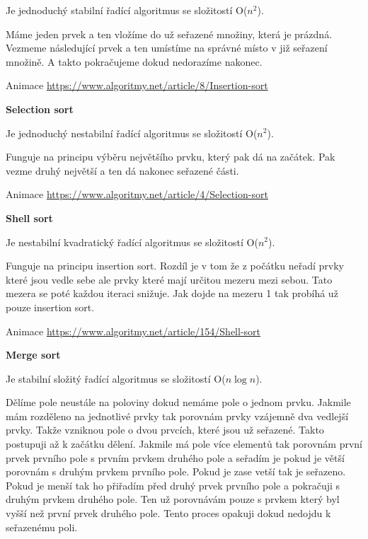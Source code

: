 Je jednoduchý stabilní řadící algoritmus se složitostí O($n^2$).

Máme jeden prvek a ten vložíme do už seřazené množiny, která je prázdná. Vezmeme následující prvek a ten umístíme na správné místo v již seřazení množině. A takto pokračujeme dokud nedorazíme nakonec.

Animace \url{https://www.algoritmy.net/article/8/Insertion-sort}

\begin{Large}\vspace{0,5cm} \textbf{Selection sort}
\end{Large}

Je jednoduchý nestabilní řadící algoritmus se složitostí O($n^2$).

Funguje na principu výběru největšího prvku, který pak dá na začátek. Pak vezme druhý největší a ten dá nakonec seřazené části.

Animace \url{https://www.algoritmy.net/article/4/Selection-sort}

\begin{Large}\vspace{0,5cm} \textbf{Shell sort}
\end{Large}

Je nestabilní kvadratický řadící algoritmus se složitostí O($n^2$).

Funguje na principu insertion sort. Rozdíl je v tom že z počátku neřadí prvky které jsou vedle sebe ale prvky které mají určitou mezeru mezi sebou. Tato mezera se poté každou iteraci snižuje. Jak dojde na mezeru 1 tak probíhá už pouze insertion sort.

Animace \url{https://www.algoritmy.net/article/154/Shell-sort}

\begin{Large}\vspace{0,5cm} \textbf{Merge sort}
\end{Large}

Je stabilní složitý řadící algoritmus se složitostí O($n\log{n}$).

Dělíme pole neustále na poloviny dokud nemáme pole o jednom prvku. Jakmile mám rozděleno na jednotlivé prvky tak porovnám prvky vzájemně dva vedlejší prvky. Takže vzniknou pole o dvou prvcích, které jsou už seřazené. Takto postupuji až k začátku dělení. Jakmile má pole více elementů tak porovnám první prvek prvního pole s prvním prvkem druhého pole a seřadím je pokud je větší porovnám s druhým prvkem prvního pole. Pokud je zase vetší tak je seřazeno. Pokud je menší tak ho přiřadím před druhý prvek prvního pole a pokračuji s druhým prvkem druhého pole. Ten už porovnávám pouze s prvkem který byl vyšší než první prvek druhého pole. Tento proces opakuji dokud nedojdu k seřazenému poli.

